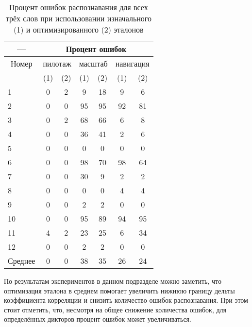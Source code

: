 \begin{table}[h]
	\centering
	\caption{Процент ошибок распознавания для всех трёх слов при использовании изначального (1) и оптимизированного (2) эталонов}
	\label{tab:errorsPercentageInitialOptimized}
	\begin{tabular}{| l | c | c | c | c | c | c |}
		\hline
		\multicolumn{1}{|c|}{---} & \multicolumn{6}{c|}{Процент ошибок} \\
		\hline
		\multicolumn{1}{|c|}{Номер} & \multicolumn{2}{c|}{пилотаж} & \multicolumn{2}{c|}{масштаб} & \multicolumn{2}{c|}{навигация} \\
		\hhline{~------}
		\multicolumn{1}{|c|}{\phantom{00} диктора \phantom{00}}& \phantom{00} (1) \phantom{00} & \phantom{00} (2) \phantom{00} & \phantom{00} (1) \phantom{00} & \phantom{00} (2) \phantom{00} & \phantom{00} (1) \phantom{00} & \phantom{00} (2) \phantom{00} \\
		\hline
		1		& 0	& 2	& 9	 & 18 & 9  & 6	\\
		2		& 0	& 0	& 95 & 95 & 92 & 81	\\
		3		& 0	& 2	& 68 & 66 & 6  & 8	\\
		4		& 0	& 0	& 36 & 41 & 2  & 6	\\
		5		& 0	& 0	& 0	 & 0  & 0  & 0	\\
		6		& 0	& 0	& 98 & 70 & 98 & 64	\\
		7		& 0	& 0	& 30 & 9  & 2  & 2	\\
		8		& 0	& 0	& 0	 & 0  & 4  & 4	\\
		9		& 0	& 0	& 2	 & 2  & 0  & 0	\\
		10		& 0	& 0	& 95 & 89 & 94 & 95	\\
		11		& 4	& 2	& 23 & 25 & 6  & 34	\\
		12		& 0	& 0	& 2	 & 2  & 0  & 0	\\
		\hline
		Среднее	& 0	& 0	& 38 & 35 & 26 & 24 \\
		\hline
	\end{tabular}
\end{table}

По результатам экспериментов в данном подразделе можно заметить, что оптимизация эталона в среднем помогает увеличить нижнюю границу дельты коэффициента корреляции и снизить количество ошибок распознавания.
При этом стоит отметить, что, несмотря на общее снижение количества ошибок, для определённых дикторов процент ошибок может увеличиваться.

\clearpage


